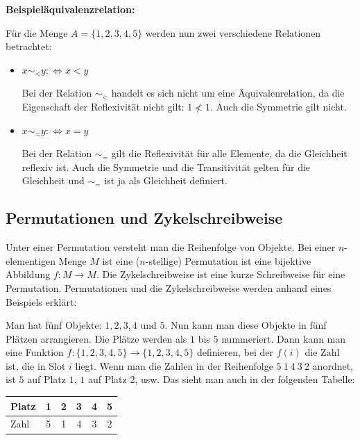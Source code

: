 \documentclass[12pt,a4paper, usenames, dvipsnames]{article}
\begin{document}
\textbf{Beispieläquivalenzrelation:}

Für die Menge $A=\{ 1, 2, 3, 4, 5 \}$ werden nun zwei verschiedene Relationen betrachtet:
\begin{itemize}
\item $x \sim_< y :\Leftrightarrow x < y$

Bei der Relation $\sim_< $ handelt es sich nicht um eine Äquivalenrelation, da die Eigenschaft der Reflexivität nicht gilt: $1 \nless 1$. Auch die Symmetrie gilt nicht.
\item $x \sim_= y :\Leftrightarrow x = y$

Bei der Relation $\sim_=$ gilt die Reflexivität für alle Elemente, da die Gleichheit reflexiv ist. Auch die Symmetrie und die Transitivität gelten für die Gleichheit und $\sim_=$ ist ja als Gleichheit definiert. 
\end{itemize}


%
%
%
%
%
%
%
%
%
%
%
%
%
\subsection*{Permutationen und Zykelschreibweise} 
\label{11}
Unter einer Permutation versteht man die Reihenfolge von Objekte. Bei einer $n$-elementigen Menge $M$ ist eine ($n$-stellige) Permutation ist eine bijektive Abbildung $f: M \rightarrow M$. Die Zykelschreibweise ist eine kurze Schreibweise für eine Permutation.
Permutationen und die Zykelschreibweise werden anhand eines Beispiels erklärt: 

Man hat fünf Objekte: $1, 2, 3, 4$ und $5$. Nun kann man diese Objekte in fünf Plätzen arrangieren. Die Plätze werden als $1$ bis $5$ nummeriert. Dann kann man eine Funktion $f:\{1,2,3,4,5\} \rightarrow \{1,2,3,4,5\}$ definieren, bei der $f(i)$ die Zahl ist, die in Slot $i$ liegt.
Wenn man die Zahlen in der Reihenfolge $5 \ 1\ 4\ 3 \ 2$ anordnet, ist $5$ auf Platz $1$, $1$ auf Platz $2$, usw. Das sieht man auch in der folgenden Tabelle: 

\begin{center}
\begin{tabular}{l ccccc}

Platz & 1 & 2 & 3 & 4 & 5 \\
\midrule
Zahl & 5 & 1 & 4 & 3 & 2 \\

\end{tabular}
\end{center}
\end{document}
